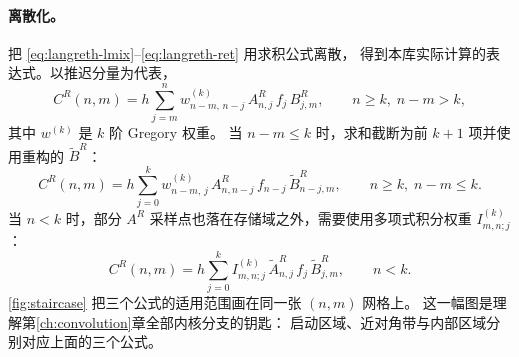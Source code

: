 \paragraph{离散化。}
把 \cref{eq:langreth-lmix}--\cref{eq:langreth-ret} 用求积公式离散，
得到本库实际计算的表达式。以推迟分量为代表，
\begin{equation}
    C^{R}(n,m)
    =
    h\sum^{n}_{j=m} w^{(k)}_{n-m,\,n-j}\,
        A^{R}_{n,j}\,f_j\,B^{R}_{j,m},
    \qquad n\ge k,\; n-m>k,
    \label{eq:ret-discrete1}
\end{equation}
其中 $w^{(k)}$ 是 $k$ 阶 Gregory 权重。
当 $n-m\le k$ 时，求和截断为前 $k+1$ 项并使用重构的
$\tilde{B}^{R}$：
\begin{equation}
    C^{R}(n,m)
    =
    h\sum^{k}_{j=0} w^{(k)}_{n-m,\,j}\,
        A^{R}_{n,n-j}\,f_{n-j}\,\tilde{B}^{R}_{n-j,m},
    \qquad n\ge k,\; n-m\le k .
    \label{eq:ret-discrete2}
\end{equation}
当 $n<k$ 时，部分 $A^{R}$ 采样点也落在存储域之外，需要使用多项式积分权重
$I^{(k)}_{m,n;j}$：
\begin{equation}
    C^{R}(n,m)
    =
    h\sum^{k}_{j=0} I^{(k)}_{m,n;j}\,
        \tilde{A}^{R}_{n,j}\,f_j\,\tilde{B}^{R}_{j,m},
    \qquad n<k .
    \label{eq:ret-discrete3}
\end{equation}
\cref{fig:staircase} 把三个公式的适用范围画在同一张 $(n,m)$ 网格上。
这一幅图是理解第\ref{ch:convolution}章全部内核分支的钥匙：
启动区域、近对角带与内部区域分别对应上面的三个公式。

